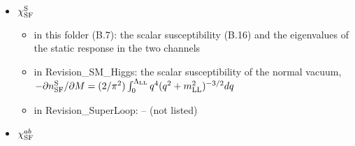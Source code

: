\documentclass[
  10pt,
]{article}
\providecommand{\tightlist}{%
  \setlength{\itemsep}{0pt}\setlength{\parskip}{0pt}}
\begin{document}
\begin{itemize}
  \begin{itemize}
  \tightlist
  \item
    in this folder (A.7, D): the charge-conjugation matrix
    \(\mathrm{diag}(\mathsf E_{\rm LL},-\mathsf E_{\rm LL})\) (Lord's
    \(C\))
  \item
    in Revision\_SM\_Higgs: the Dirac matrices of the canonical frame in
    the chiral basis,
    \(\gamma^0_{\rm LL}=\begin{pmatrix}0&\sigma^{\rm LL}_0\\\sigma^{\rm LL}_0&0\end{pmatrix}\),
    \(\gamma^j_{\rm LL}=\begin{pmatrix}0&\sigma^{\rm LL}_j\\-\sigma^{\rm LL}_j&0\end{pmatrix}\);
    the chirality matrix
    \(\gamma^{\rm ch}_{\rm LL}=i\gamma^0_{\rm LL}\gamma^1_{\rm LL}\gamma^2_{\rm LL}\gamma^3_{\rm LL}=\mathrm{diag}(-1,-1,1,1)\);
    the charge-conjugation matrix
    \(C_{\rm LL}=i\gamma^2_{\rm LL}\gamma^0_{\rm LL}\);
    \(\alpha^j_{\rm LL}=\gamma^0_{\rm LL}\gamma^j_{\rm LL}\),
    \(\beta_{\rm LL}=\gamma^0_{\rm LL}\) (on the eight components each
    acts as its tensor product with \(\sigma^{\rm LL}_0\))
  \item
    in Revision\_SuperLoop: the \(4\times4\) Dirac matrices of
    \(\mathbb R^{1,3}_{\rm LL}\) in the chiral basis,
    \(\gamma^0_{\rm LL}=\begin{pmatrix}0&\sigma^{\rm LL}_0\\\sigma^{\rm LL}_0&0\end{pmatrix}\),
    \(\gamma^j_{\rm LL}=\begin{pmatrix}0&\sigma^{\rm LL}_j\\-\sigma^{\rm LL}_j&0\end{pmatrix}\);
    the chirality matrix
    \(\gamma^{\rm ch}_{\rm LL}=i\gamma^0_{\rm LL}\gamma^1_{\rm LL}\gamma^2_{\rm LL}\gamma^3_{\rm LL}=\mathrm{diag}(-1,-1,1,1)\);
    the charge-conjugation matrix
    \(C_{\rm LL}=i\gamma^2_{\rm LL}\gamma^0_{\rm LL}\);
    \(\alpha^j_{\rm LL}=\gamma^0_{\rm LL}\gamma^j_{\rm LL}\),
    \(\beta_{\rm LL}=\gamma^0_{\rm LL}\) (on Dirac \(\otimes\) isospin
    each acts as \(\otimes\sigma^{\rm LL}_0\))
  \end{itemize}
\item
  \(\chi^{\rm S}_{\rm SF}\)

  \begin{itemize}
  \tightlist
  \item
    in this folder (B.7): the scalar susceptibility (B.16) and the
    eigenvalues of the static response in the two channels
  \item
    in Revision\_SM\_Higgs: the scalar susceptibility of the normal
    vacuum,
    \(-\partial n^{\rm S}_{\rm SF}/\partial M=(2/\pi^2)\int_0^{\Lambda_{\rm LL}}q^4(q^2+m_{\rm LL}^2)^{-3/2}dq\)
  \item
    in Revision\_SuperLoop: -- (not listed)
  \end{itemize}
\item
  \(\chi^{ab}_{\rm SF}\)


\end{itemize}
\end{document}
